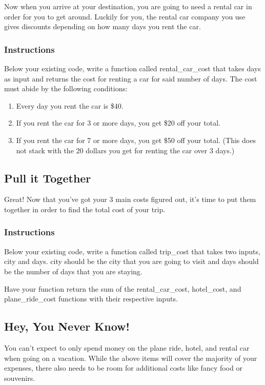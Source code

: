 \documentclass[12pt,a4paper,final,twoside,onecolumn,titlepage]{book}
\begin{document}
Now when you arrive at your destination, you are going to need a rental car in order for you to get around. Luckily for you, the rental car company you use gives discounts depending on how many days you rent the car.
\subsubsection{Instructions}

Below your existing code, write a function called rental\_car\_cost that takes days as input and returns the cost for renting a car for said number of days. The cost must abide by the following conditions:
\begin{enumerate}
\item    Every day you rent the car is \$40.
\item    If you rent the car for 3 or more days, you get \$20 off your total.
\item    If you rent the car for 7 or more days, you get \$50 off your total. (This does not stack with the 20 dollars you get for renting the car over 3 days.)
\end{enumerate}

\subsection{Pull it Together}

Great! Now that you've got your 3 main costs figured out, it's time to put them together in order to find the total cost of your trip.
\subsubsection{Instructions}

Below your existing code, write a function called trip\_cost that takes two inputs, city and days. city should be the city that you are going to visit and days should be the number of days that you are staying.

Have your function return the sum of the rental\_car\_cost, hotel\_cost, and plane\_ride\_cost functions with their respective inputs.

\subsection{Hey, You Never Know!}

You can't expect to only spend money on the plane ride, hotel, and rental car when going on a vacation. While the above items will cover the majority of your expenses, there also needs to be room for additional costs like fancy food or souvenirs.
\end{document}
